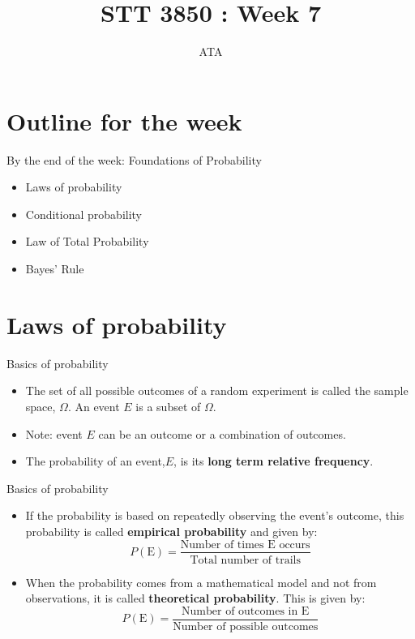 \documentclass[
  ignorenonframetext,
]{beamer}
\title{STT 3850 : Week 7}
\author{ATA}
\date{}
\institute{Appalachian State University}
\providecommand{\tightlist}{%
  \setlength{\itemsep}{0pt}\setlength{\parskip}{0pt}}
\begin{document}
\frame{\titlepage}

\section{Outline for the week}\label{outline-for-the-week}

\begin{frame}{By the end of the week: Foundations of Probability}
\label{by-the-end-of-the-week-foundations-of-probability}
\begin{itemize}
\tightlist
\item
  Laws of probability
\item
  Conditional probability
\item
  Law of Total Probability
\item
  Bayes' Rule
\end{itemize}
\end{frame}

\section{Laws of probability}\label{laws-of-probability}

\begin{frame}{Basics of probability}
\label{basics-of-probability}
\begin{itemize}
\item
  The set of all possible outcomes of a random experiment is called the
  sample space, \(\Omega\). An event \(E\) is a subset of \(\Omega\).
\item
  Note: event \(E\) can be an outcome or a combination of outcomes.
\item
  The probability of an event,\(E\), is its \textbf{long term relative
  frequency}.
\end{itemize}
\end{frame}

\begin{frame}{Basics of probability}
\label{basics-of-probability-1}
\begin{itemize}
\tightlist
\item
  If the probability is based on repeatedly observing the event's
  outcome, this probability is called \textbf{empirical probability} and
  given by:
  \[P(\text{E})=\frac{\text{Number of times E occurs}}{\text{Total number of trails}}\]
\item
  When the probability comes from a mathematical model and not from
  observations, it is called \textbf{theoretical probability}. This is
  given by:
  \[P(\text{E})=\frac{\text{Number of outcomes in E}}{\text{Number of possible outcomes}}\]
\end{itemize}
\end{frame}
\end{document}
